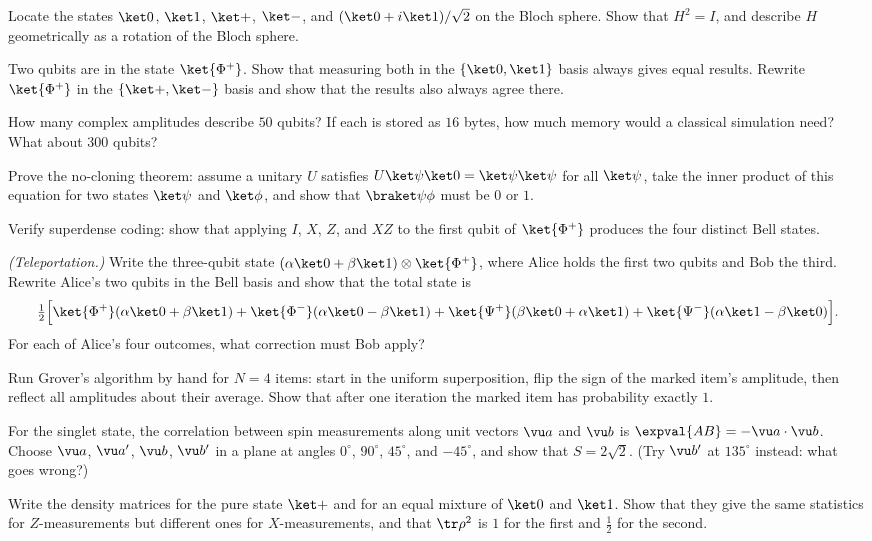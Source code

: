 \begin{problems}
\core Locate the states $\ket0$, $\ket1$, $\ket+$, $\ket-$, and $(\ket0+i\ket1)/\sqrt2$ on the Bloch sphere. Show that $H^2 = I$, and describe $H$ geometrically as a rotation of the Bloch sphere.

 Two qubits are in the state $\ket{\Phi^+}$. Show that measuring both in the $\{\ket0,\ket1\}$ basis always gives equal results. Rewrite $\ket{\Phi^+}$ in the $\{\ket+,\ket-\}$ basis and show that the results also always agree there.

 How many complex amplitudes describe $50$ qubits? If each is stored as $16$ bytes, how much memory would a classical simulation need? What about $300$ qubits?

\core \label{prob:noclone} Prove the no-cloning theorem: assume a unitary $U$ satisfies $U\ket\psi\ket0 = \ket\psi\ket\psi$ for all $\ket\psi$, take the inner product of this equation for two states $\ket\psi$ and $\ket\phi$, and show that $\braket\psi\phi$ must be $0$ or $1$.

 Verify superdense coding: show that applying $I$, $X$, $Z$, and $XZ$ to the first qubit of $\ket{\Phi^+}$ produces the four distinct Bell states.

\core \label{prob:teleport} \emph{(Teleportation.)} Write the three-qubit state $(\alpha\ket0+\beta\ket1)\otimes\ket{\Phi^+}$, where Alice holds the first two qubits and Bob the third. Rewrite Alice's two qubits in the Bell basis and show that the total state is
\[
  \tfrac12\Big[\ket{\Phi^+}(\alpha\ket0+\beta\ket1) + \ket{\Phi^-}(\alpha\ket0-\beta\ket1) + \ket{\Psi^+}(\beta\ket0+\alpha\ket1) + \ket{\Psi^-}(\alpha\ket1-\beta\ket0)\Big].
\]
For each of Alice's four outcomes, what correction must Bob apply?

 Run Grover's algorithm by hand for $N=4$ items: start in the uniform superposition, flip the sign of the marked item's amplitude, then reflect all amplitudes about their average. Show that after one iteration the marked item has probability exactly $1$.

\core \label{prob:chsh} For the singlet state, the correlation between spin measurements along unit vectors $\vu a$ and $\vu b$ is $\expval{AB} = -\vu a\cdot\vu b$. Choose $\vu a$, $\vu a'$, $\vu b$, $\vu b'$ in a plane at angles $0^\circ$, $90^\circ$, $45^\circ$, and $-45^\circ$, and show that $S = 2\sqrt2$. (Try $\vu b'$ at $135^\circ$ instead: what goes wrong?)

 Write the density matrices for the pure state $\ket+$ and for an equal mixture of $\ket0$ and $\ket1$. Show that they give the same statistics for $Z$-measurements but different ones for $X$-measurements, and that $\tr\rho^2$ is $1$ for the first and $\tfrac12$ for the second.


\end{problems}
